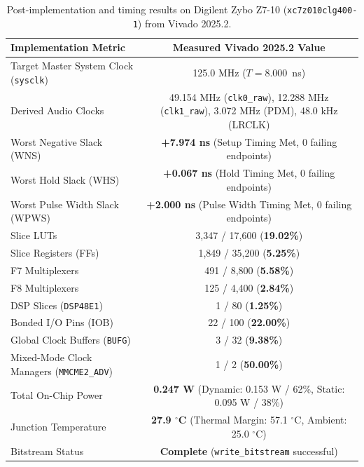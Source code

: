 \documentclass[11pt,a4paper]{article}
\begin{document}
\begin{table}[H]\centering\small
\caption{Post-implementation and timing results on Digilent Zybo Z7-10 (\texttt{xc7z010clg400-1}) from Vivado 2025.2.}\label{tab:fpga}
\begin{tabular}{@{}lc@{}}
\toprule
Implementation Metric & Measured Vivado 2025.2 Value\\
\midrule
Target Master System Clock (\texttt{sysclk}) & 125.0 MHz ($T = 8.000$~ns)\\
Derived Audio Clocks & 49.154 MHz (\texttt{clk0\_raw}), 12.288 MHz (\texttt{clk1\_raw}), 3.072 MHz (PDM), 48.0 kHz (LRCLK)\\
Worst Negative Slack (WNS) & \textbf{+7.974 ns} (Setup Timing Met, 0 failing endpoints)\\
Worst Hold Slack (WHS) & \textbf{+0.067 ns} (Hold Timing Met, 0 failing endpoints)\\
Worst Pulse Width Slack (WPWS) & \textbf{+2.000 ns} (Pulse Width Timing Met, 0 failing endpoints)\\
Slice LUTs & 3,347 / 17,600 (\textbf{19.02\%})\\
Slice Registers (FFs) & 1,849 / 35,200 (\textbf{5.25\%})\\
F7 Multiplexers & 491 / 8,800 (\textbf{5.58\%})\\
F8 Multiplexers & 125 / 4,400 (\textbf{2.84\%})\\
DSP Slices (\texttt{DSP48E1}) & 1 / 80 (\textbf{1.25\%})\\
Bonded I/O Pins (IOB) & 22 / 100 (\textbf{22.00\%})\\
Global Clock Buffers (\texttt{BUFG}) & 3 / 32 (\textbf{9.38\%})\\
Mixed-Mode Clock Managers (\texttt{MMCME2\_ADV}) & 1 / 2 (\textbf{50.00\%})\\
Total On-Chip Power & \textbf{0.247 W} (Dynamic: 0.153 W / 62\%, Static: 0.095 W / 38\%)\\
Junction Temperature & \textbf{27.9 $^\circ$C} (Thermal Margin: 57.1 $^\circ$C, Ambient: 25.0 $^\circ$C)\\
Bitstream Status & \textbf{Complete} (\texttt{write\_bitstream} successful)\\
\bottomrule
\end{tabular}
\end{table}
\end{document}
